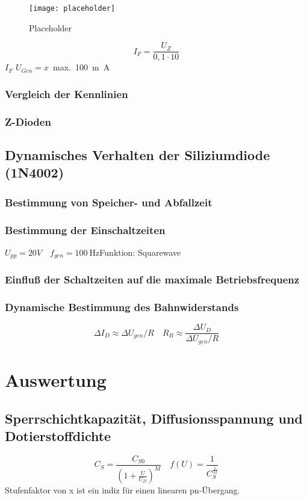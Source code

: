 \documentclass[
	a4paper, %
	12pt, %
]{CSUniSchoolLabReport}
\newcommand{\milli}{m}
\begin{document}
\begin{figure}[H] %
	\centering %
	\texttt{[image: placeholder]} %
	\caption{Placeholder}
\end{figure}

\[
I_F = \frac{U_Z}{0,1 \cdot 10}
\]
$I_{F}$ 
$U_{Gen}= x$\ max.\ \SI{100}{\milli\ampere}
\subsubsection{Vergleich der Kennlinien}
\subsubsection{Z-Dioden}
\subsection{Dynamisches Verhalten der Siliziumdiode (1N4002)}
\subsubsection{Bestimmung von Speicher- und Abfallzeit}
\subsubsection{Bestimmung der Einschaltzeiten}
$U_{pp} = 20V \quad f_{gen} = \SI{100}{\hertz}$\quad Funktion: Squarewave
\subsubsection{Einfluß der Schaltzeiten auf die maximale Betriebsfrequenz}
\subsubsection{Dynamische Bestimmung des Bahnwiderstands}

\[
\Delta I_D \approx \Delta U_{gen}/R \quad R_B \approx \frac{\Delta U_D}{\Delta U_{gen}/R}
\]
\section{Auswertung}
\subsection{Sperrschichtkapazität, Diffusionsspannung und \\Dotierstoffdichte}
\[
C_S = \frac{C_{S0}}{(1+\frac{U}{U_D})^M}\quad f(U) = \frac{1}{C_S^\frac{1}{M}}
\]
Stufenfaktor von x ist ein indiz für einen linearen pn-Übergang.
\end{document}
